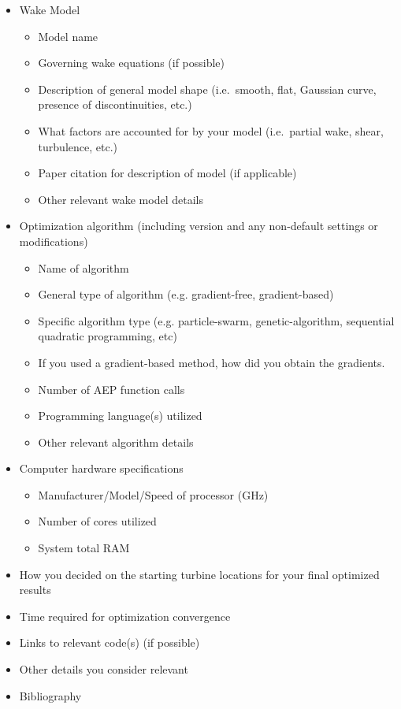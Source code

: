\documentclass[]{aiaa-tc}
\begin{document}
\begin{itemize}
	\item Wake Model
	      \begin{itemize}
		      \item Model name
		      \item Governing wake equations (if possible)
		      \item Description of general model shape (i.e.~smooth, flat, Gaussian curve, presence of discontinuities, etc.)
		      \item What factors are accounted for by your model (i.e.~partial wake, shear, turbulence, etc.)
		      \item Paper citation for description of model (if applicable)
		      \item Other relevant wake model details
	      \end{itemize}
	\item Optimization algorithm (including version and any non-default settings or modifications)
	      \begin{itemize}
		      \item Name of algorithm
		      \item General type of algorithm (e.g. gradient-free, gradient-based)
		      \item Specific algorithm type (e.g. particle-swarm, genetic-algorithm, sequential quadratic programming, etc)
		      \item If you used a gradient-based method, how did you obtain the gradients.
		      \item Number of AEP function calls
		      \item Programming language(s) utilized
		      \item Other relevant algorithm details
	      \end{itemize}
	\item Computer hardware specifications
	      \begin{itemize}
		      \item Manufacturer/Model/Speed of processor (GHz)
		      \item Number of cores utilized
		      \item System total RAM
	      \end{itemize}
	\item How you decided on the starting turbine locations for your final optimized results
	\item Time required for optimization convergence
	\item Links to relevant code(s) (if possible)
	\item Other details you consider relevant
	\item Bibliography
\end{itemize}
\end{document}
